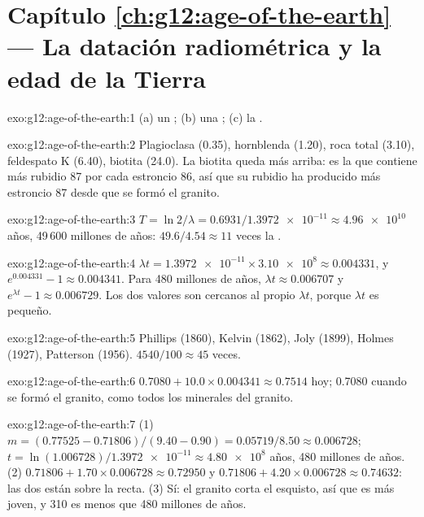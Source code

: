 \section*{Capítulo \ref{ch:g12:age-of-the-earth} --- La datación radiométrica y la edad de la Tierra}

\begin{solution}{exo:g12:age-of-the-earth:1}
(a) un ; (b) una ; (c) la .
\end{solution}

\begin{solution}{exo:g12:age-of-the-earth:2}
Plagioclasa (0.35), hornblenda (1.20), roca total (3.10), feldespato K (6.40),
biotita (24.0). La biotita queda más arriba: es la que contiene más rubidio 87
por cada estroncio 86, así que su rubidio ha producido más estroncio 87 desde
que se formó el granito.
\end{solution}

\begin{solution}{exo:g12:age-of-the-earth:3}
$T = \ln 2/\lambda = 0.6931/\num{1.3972e-11} \approx \num{4.96e10}$ años,
49\,600 millones de años: $49.6/4.54 \approx 11$ veces la .
\end{solution}

\begin{solution}{exo:g12:age-of-the-earth:4}
$\lambda t = \num{1.3972e-11} \times \num{3.10e8} \approx 0.004331$, y
$e^{0.004331} - 1 \approx 0.004341$. Para 480 millones de años, $\lambda t
\approx 0.006707$ y $e^{\lambda t} - 1 \approx 0.006729$. Los dos valores son
cercanos al propio $\lambda t$, porque $\lambda t$ es pequeño.
\end{solution}

\begin{solution}{exo:g12:age-of-the-earth:5}
Phillips (1860), Kelvin (1862), Joly (1899), Holmes (1927), Patterson
(1956). $4540/100 \approx 45$ veces.
\end{solution}

\begin{solution}{exo:g12:age-of-the-earth:6}
$0.7080 + 10.0 \times 0.004341 \approx 0.7514$ hoy; 0.7080 cuando se formó el
granito, como todos los minerales del granito.
\end{solution}

\begin{solution}{exo:g12:age-of-the-earth:7}
(1) $m = (0.77525 - 0.71806)/(9.40 - 0.90) = 0.05719/8.50 \approx 0.006728$;
$t = \ln(1.006728)/\num{1.3972e-11} \approx \num{4.80e8}$ años, 480 millones
de años. (2) $0.71806 + 1.70 \times 0.006728 \approx 0.72950$ y $0.71806 + 4.20
\times 0.006728 \approx 0.74632$: las dos están sobre la recta. (3) Sí: el
granito corta el esquisto, así que es más joven, y 310 es menos que 480
millones de años.
\end{solution}

